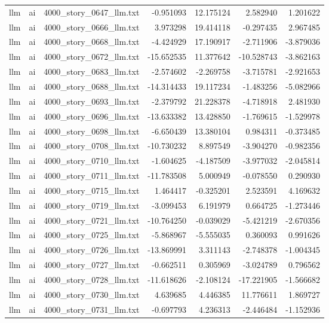 \begin{longtable}{lllrrrr}
llm & ai & 4000\_story\_0647\_llm.txt & -0.951093 & 12.175124 & 2.582940 & 1.201622 \\
llm & ai & 4000\_story\_0666\_llm.txt & 3.973298 & 19.414118 & -0.297435 & 2.967485 \\
llm & ai & 4000\_story\_0668\_llm.txt & -4.424929 & 17.190917 & -2.711906 & -3.879036 \\
llm & ai & 4000\_story\_0672\_llm.txt & -15.652535 & 11.377642 & -10.528743 & -3.862163 \\
llm & ai & 4000\_story\_0683\_llm.txt & -2.574602 & -2.269758 & -3.715781 & -2.921653 \\
llm & ai & 4000\_story\_0688\_llm.txt & -14.314433 & 19.117234 & -1.483256 & -5.082966 \\
llm & ai & 4000\_story\_0693\_llm.txt & -2.379792 & 21.228378 & -4.718918 & 2.481930 \\
llm & ai & 4000\_story\_0696\_llm.txt & -13.633382 & 13.428850 & -1.769615 & -1.529978 \\
llm & ai & 4000\_story\_0698\_llm.txt & -6.650439 & 13.380104 & 0.984311 & -0.373485 \\
llm & ai & 4000\_story\_0708\_llm.txt & -10.730232 & 8.897549 & -3.904270 & -0.982356 \\
llm & ai & 4000\_story\_0710\_llm.txt & -1.604625 & -4.187509 & -3.977032 & -2.045814 \\
llm & ai & 4000\_story\_0711\_llm.txt & -11.783508 & 5.000949 & -0.078550 & 0.290930 \\
llm & ai & 4000\_story\_0715\_llm.txt & 1.464417 & -0.325201 & 2.523591 & 4.169632 \\
llm & ai & 4000\_story\_0719\_llm.txt & -3.099453 & 6.191979 & 0.664725 & -1.273446 \\
llm & ai & 4000\_story\_0721\_llm.txt & -10.764250 & -0.039029 & -5.421219 & -2.670356 \\
llm & ai & 4000\_story\_0725\_llm.txt & -5.868967 & -5.555035 & 0.360093 & 0.991626 \\
llm & ai & 4000\_story\_0726\_llm.txt & -13.869991 & 3.311143 & -2.748378 & -1.004345 \\
llm & ai & 4000\_story\_0727\_llm.txt & -0.662511 & 0.305969 & -3.024789 & 0.796562 \\
llm & ai & 4000\_story\_0728\_llm.txt & -11.618626 & -2.108124 & -17.221905 & -1.566682 \\
llm & ai & 4000\_story\_0730\_llm.txt & 4.639685 & 4.446385 & 11.776611 & 1.869727 \\
llm & ai & 4000\_story\_0731\_llm.txt & -0.697793 & 4.236313 & -2.446484 & -1.152936 \\

\end{longtable}
